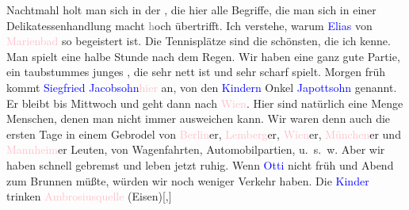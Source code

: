                Nachtmahl holt man sich in der \label{K_L03510-2v}\label{K_L03510-2h}, die hier alle
               Begriffe, die man sich in einer Delikatessenhandlung macht \textcolor{gray}{h}och
               übertrifft. Ich verstehe, warum \textcolor{blue}{Elias}{}\ledrightnote{\textcolor{blue}{Julius Elias}} von \textcolor{pink}{Marienbad}{}\ledrightnote{\textcolor{pink}{Marienbad}} so begeistert {\pb}ist. Die Tennisplätze sind die
               schönsten, die ich kenne. Man spielt eine halbe Stunde nach dem Regen. Wir haben eine
               ganz gute Partie, ein taubstummes junges \label{K_L03510-3v}\label{K_L03510-3h}, die sehr nett
               ist und sehr scharf spielt. Morgen{ }früh kommt \textcolor{blue}{Siegfried Jacobsohn}{}\ledrightnote{\textcolor{blue}{Siegfried Jacobsohn}}{ }\textcolor{pink}{hier}{}\ledrightnote{{$\rightarrow$}\textcolor{pink}{Marienbad}} an, von den \textcolor{blue}{Kindern}{}\ledrightnote{{$\rightarrow$}\textcolor{blue}{Paul Salten}{\newline}{$\rightarrow$}\textcolor{blue}{Anna Katharina Rehmann}} Onkel \textcolor{blue}{Japottsohn}{}\ledrightnote{\textcolor{blue}{Siegfried Jacobsohn}} genannt. Er bleibt bis Mittwoch und geht dann nach \textcolor{pink}{Wien}{}\ledrightnote{\textcolor{pink}{Wien}}. Hier sind natürlich eine Menge Menschen, denen man nicht immer
               ausweichen kann. Wir waren denn auch die ersten Tage in einem Gebrodel von \textcolor{pink}{Berlin}{}\ledrightnote{\textcolor{pink}{Berlin}}er, \textcolor{pink}{Lemberg}{}\ledrightnote{\textcolor{pink}{Lviv}}er, \textcolor{pink}{Wien}{}\ledrightnote{\textcolor{pink}{Wien}}er, \textcolor{pink}{München}{}\ledrightnote{\textcolor{pink}{München}}er und \textcolor{pink}{Mannheim}{}\ledrightnote{\textcolor{pink}{Mannheim}}er
               Leuten, von Wagenfahrten, Automobilpartien, u. s. w. Aber wir haben schnell gebremst
               und leben jetzt ruhig. Wenn \textcolor{blue}{Otti}{}\ledrightnote{\textcolor{blue}{Ottilie Salten}} nicht früh
               und Abend zum Brunnen müßte, würden wir noch weniger Verkehr haben. Die \textcolor{blue}{Kinder}{}\ledrightnote{{$\rightarrow$}\textcolor{blue}{Paul Salten}{\newline}{$\rightarrow$}\textcolor{blue}{Anna Katharina Rehmann}} trinken \textcolor{pink}{Ambrosiusquelle}{}\ledrightnote{\textcolor{pink}{Ambrosiusquelle}} (Eisen){[},{]}
